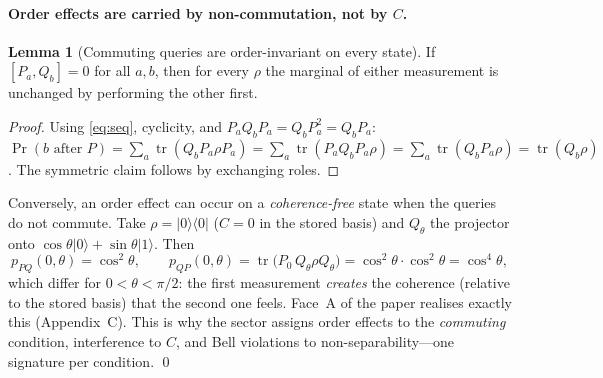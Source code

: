 \documentclass[11pt]{article}
\newcommand{\ket}[1]{\lvert #1 \rangle}
\newcommand{\bra}[1]{\langle #1 \rvert}
\newcommand{\tr}{\operatorname{tr}}
\theoremstyle{definition}
\newtheorem{qlem}{Lemma}
\begin{document}
\paragraph{Order effects are carried by non-commutation, not by $C$.}
\begin{qlem}[Commuting queries are order-invariant on every state]\label{lem:comm}
If $[P_a,Q_b]=0$ for all $a,b$, then for every $\rho$ the marginal of either measurement is unchanged by performing the other first.
\end{qlem}
\begin{proof}
Using \eqref{eq:seq}, cyclicity, and $P_aQ_bP_a=Q_bP_a^2=Q_bP_a$:
$\Pr(b \text{ after } P)=\sum_a \tr(Q_bP_a\rho P_a)=\sum_a\tr(P_aQ_bP_a\rho)=\sum_a \tr(Q_bP_a\rho)=\tr(Q_b\rho)$.
The symmetric claim follows by exchanging roles.
\end{proof}
\noindent Conversely, an order effect can occur on a \emph{coherence-free} state when the queries do not commute. Take $\rho=\ket0\bra0$ ($C=0$ in the stored basis) and $Q_\theta$ the projector onto $\cos\theta\ket0+\sin\theta\ket1$. Then
\[
p_{PQ}(0,\theta)=\cos^2\theta,
\qquad
p_{QP}(0,\theta)=\tr\big(P_0\,Q_\theta\rho Q_\theta\big)=\cos^2\theta\cdot\cos^2\theta=\cos^4\theta,
\]
which differ for $0<\theta<\pi/2$: the first measurement \emph{creates} the coherence (relative to the stored basis) that the second one feels. Face~A of the paper realises exactly this (Appendix~C). This is why the sector assigns order effects to the \emph{commuting} condition, interference to $C$, and Bell violations to non-separability---one signature per condition. \qed
\end{document}
